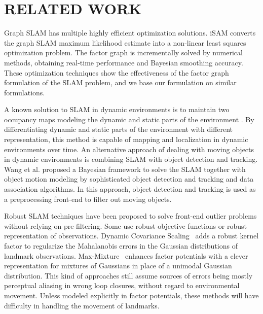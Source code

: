 \section{RELATED WORK}

Graph SLAM has multiple highly efficient optimization solutions.
iSAM \cite{isam} converts the graph SLAM maximum likelihood estimate into a
non-linear least squares optimization problem.  The factor graph is incrementally solved by numerical methods, obtaining real-time performance and Bayesian smoothing accuracy. These optimization techniques show the effectiveness of the factor graph formulation of the SLAM problem, and we base our formulation on similar formulations.


A known solution to SLAM in dynamic environments is to maintain two occupancy
maps modeling the dynamic and static parts of the environment \cite{wolf05}. By
differentiating dynamic and static parts of the environment with different
representation, this method is capable of mapping and localization in dynamic
environments over time. An alternative approach of dealing with
moving objects in dynamic environments is combining SLAM with
object detection and tracking. Wang et al. \cite{wang2003online} proposed a Bayesian
framework to solve the SLAM together with object motion modeling by
sophisticated object detection and tracking and data association algorithms.
In this approach, object detection and tracking is used as a preprocessing
front-end to filter out moving objects. 

Robust SLAM techniques have been proposed to solve front-end outlier problems
without relying on pre-filtering. Some use robust objective functions or robust
representation of observations. Dynamic Covariance Scaling~\cite{DCS} adds a
robust kernel factor to regularize the Mahalanobis errors in the Gaussian
distributions of landmark observations.  Max-Mixture~\cite{mm} enhances factor
potentials with a clever representation for mixtures of Gaussians in place of a unimodal Gaussian distribution. This kind of approaches still assume sources of errors being mostly perceptual aliasing in wrong loop closures, without regard to
environmental movement.  Unless modeled explicitly in factor potentials, these methods will have difficulty in handling the movement of landmarks.

